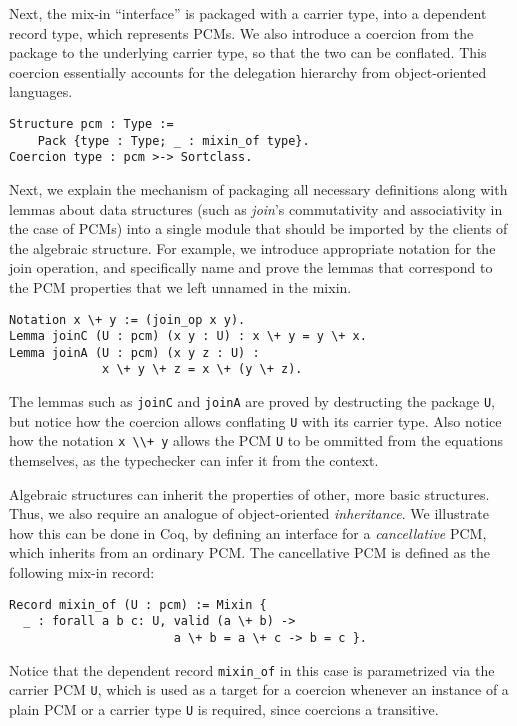 \documentclass[blockstyle,preprint,nocopyrightspace]{sigplanconf}
\newcommand{\is}[1]{\textcolor{blue}{(Ilya: {#1})}}
\newcommand{\an}[1]{\textcolor{red}{(Aleks: {#1})}}
\newcommand{\code}[1]{\lstinline{#1}}
\begin{document}
Next, the mix-in ``interface'' is packaged with a carrier type, into a
dependent record type, which represents PCMs. We also introduce a
coercion from the package to the underlying carrier type, so that the
two can be conflated. This coercion essentially accounts for the
delegation hierarchy from object-oriented languages.
%
%
\begin{lstlisting}
Structure pcm : Type := 
    Pack {type : Type; _ : mixin_of type}.
Coercion type : pcm >-> Sortclass.
\end{lstlisting}
%
Next, we explain the mechanism of packaging all necessary definitions
along with lemmas about data structures (such as \emph{join}'s
commutativity and associativity in the case of PCMs) into a single
module that should be imported by the clients of the algebraic
structure.  For example, we introduce appropriate notation for the
join operation, and specifically name and prove the lemmas that
correspond to the PCM properties that we left unnamed in the mixin.
\begin{lstlisting}
Notation x \+ y := (join_op x y).
Lemma joinC (U : pcm) (x y : U) : x \+ y = y \+ x.
Lemma joinA (U : pcm) (x y z : U) : 
             x \+ y \+ z = x \+ (y \+ z).
\end{lstlisting}
The lemmas such as \code{joinC} and \code{joinA} are proved by
destructing the package \code{U}, but notice how the coercion allows
conflating \code{U} with its carrier type. Also notice how the
notation \code{x \\+ y} allows the PCM \code{U} to be ommitted from
the equations themselves, as the typechecker can infer it from the
context.

Algebraic structures can inherit the properties of other, more basic
structures. Thus, we also require an analogue of object-oriented
\emph{inheritance}. We illustrate how this can be done in Coq, by
defining an interface for a \emph{cancellative} PCM, which inherits
from an ordinary PCM. The cancellative PCM is defined as the following
mix-in record:
%
\begin{lstlisting}
Record mixin_of (U : pcm) := Mixin {
  _ : forall a b c: U, valid (a \+ b) -> 
                       a \+ b = a \+ c -> b = c }.
\end{lstlisting}
%
Notice that the dependent record \code{mixin_of} in this case is
parametrized via the carrier PCM \code{U}, which is used as a target
for a coercion whenever an instance of a plain PCM or a carrier type
\code{U} is required, since coercions a transitive.
%
%
%
\end{document}

